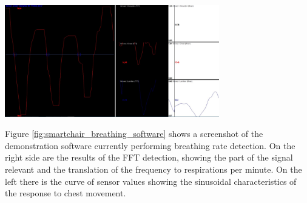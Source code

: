 \begin{minipage}{\linewidth}
\centering
\includegraphics[width=0.7\textwidth]{images/smartchair_breathing_software}
\label{fig:smartchair_breathing_software}
\end{minipage}

Figure \ref{fig:smartchair_breathing_software} shows a screenshot of the demonstration software currently performing breathing rate detection. On the right side are the results of the FFT detection, showing the part of the signal relevant and the translation of the frequency to respirations per minute. On the left there is the curve of sensor values showing the sinusoidal characteristics of the response to chest movement.

